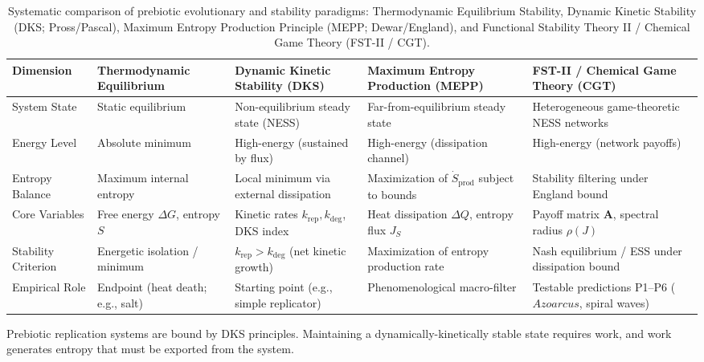 \documentclass[12pt,a4paper]{article}
\theoremstyle{remark}
\begin{document}
\begin{table}[htbp]
\centering
\caption{Systematic comparison of prebiotic evolutionary and stability paradigms: Thermodynamic Equilibrium Stability, Dynamic Kinetic Stability (DKS; Pross/Pascal), Maximum Entropy Production Principle (MEPP; Dewar/England), and Functional Stability Theory II / Chemical Game Theory (FST-II / CGT).}
\label{tab:paradigm-comparison}
\scriptsize
\setlength{\tabcolsep}{3pt}
\begin{tabularx}{\textwidth}{@{}>{\RaggedRight\arraybackslash}p{}>{\RaggedRight\arraybackslash}p{}>{\RaggedRight\arraybackslash}p{}>{\RaggedRight\arraybackslash}p{}>{\RaggedRight\arraybackslash}X@{}}
\toprule
\textbf{Dimension} & \textbf{Thermo\-dynamic Equilibrium} & \textbf{Dynamic Kinetic Stability (DKS)} & \textbf{Maximum Entropy Production (MEPP)} & \textbf{FST-II / Chemical Game Theory (CGT)} \\
\midrule
System State & Static equilibrium & Non-equilibrium steady state (NESS) & Far-from-equilibrium steady state & Heterogeneous game-theoretic NESS networks \\
Energy Level & Absolute minimum & High-energy (sustained by flux) & High-energy (dissipation channel) & High-energy (network payoffs) \\
Entropy Balance & Maximum internal entropy & Local minimum via external dissipation & Maximization of $\dot{S}_{\text{prod}}$ subject to bounds & Stability filtering under England bound \\
Core Variables & Free energy $\Delta G$, entropy $S$ & Kinetic rates $k_{\text{rep}}, k_{\text{deg}}$, DKS index & Heat dissipation $\Delta Q$, entropy flux $J_S$ & Payoff matrix $\mathbf{A}$, spectral radius $\rho(J)$ \\
Stability Criterion & Energetic isolation / minimum & $k_{\text{rep}} > k_{\text{deg}}$ (net kinetic growth) & Maximization of entropy production rate & Nash equilibrium / ESS under dissipation bound \\
Empirical Role & Endpoint (heat death; e.g., salt) & Starting point (e.g., simple replicator) & Phenomenological macro-filter & Testable predictions P1--P6 ($Azoarcus$, spiral waves) \\
\bottomrule
\end{tabularx}
\end{table}

Prebiotic replication systems are bound by DKS principles. Maintaining a dynamically-kinetically stable state requires work, and work generates entropy that must be exported from the system.
\end{document}
